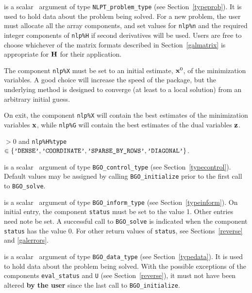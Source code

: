 \documentclass{galahad}
\newcommand{\packagename}{BGO}
\begin{document}
\vspace*{-2mm}
\begin{description}
 is a scalar \intentinout\ argument of type
{\tt NLPT\_problem\_type}
(see Section~\ref{typeprob}).
It is used to hold data about the problem being solved.
For a new problem, the user must allocate all the array components,
and set values for {\tt nlp\%n}
and the required integer components of {\tt nlp\%H} if second derivatives
will be used.
Users are free to choose whichever
of the matrix formats described in Section~\ref{galmatrix}
is appropriate for ${\mathbf{H}}$ for their application.

\noindent
The component {\tt nlp\%X} must be set to an initial estimate, ${\mathbf{x}}^{0}$,
of the minimization variables. A good choice will increase the speed
of the package, but the underlying method is designed to converge (at least
to a local solution) from an arbitrary initial guess.

\noindent
On exit, the component {\tt nlp\%X} will contain the best estimates of the
minimization variables ${\mathbf{x}}$, while {\tt nlp\%G} will contain the best 
estimates of the dual variables ${\mathbf{z}}$.

\noindent
{} $> 0$ and
{\tt nlp\%H\%type} $\in \{
  \mbox{\tt 'DENSE'}, \mbox{\tt 'COORDINATE'}, \mbox{\tt 'SPARSE\_BY\_ROWS'},
  \mbox{\tt 'DIAGONAL'} \}$.

 is a scalar \intentin\ argument of type
{\tt \packagename\_control\_type}
(see Section~\ref{typecontrol}). Default values may be assigned by calling
{\tt \packagename\_initialize} prior to the first call to
{\tt \packagename\_solve}. 

 is a scalar \intentinout\ argument of type
{\tt \packagename\_inform\_type}
(see Section~\ref{typeinform}).
On initial entry, the  component {\tt status} must be set to the value 1.
Other entries need note be set.
A successful call to
{\tt \packagename\_solve}
is indicated when the  component {\tt status} has the value 0.
For other return values of {\tt status}, see Sections~\ref{reverse} and
\ref{galerrors}.

 is a scalar \intentinout\ argument of type
{\tt \packagename\_data\_type}
(see Section~\ref{typedata}). It is used to hold data about the problem being
solved. With the possible exceptions of the components
{\tt eval\_status} and {\tt U} (see Section~\ref{reverse}),
it must not have been altered {\bf by the user} since the last call to
{\tt \packagename\_initialize}.


\end{description}
\end{document}
